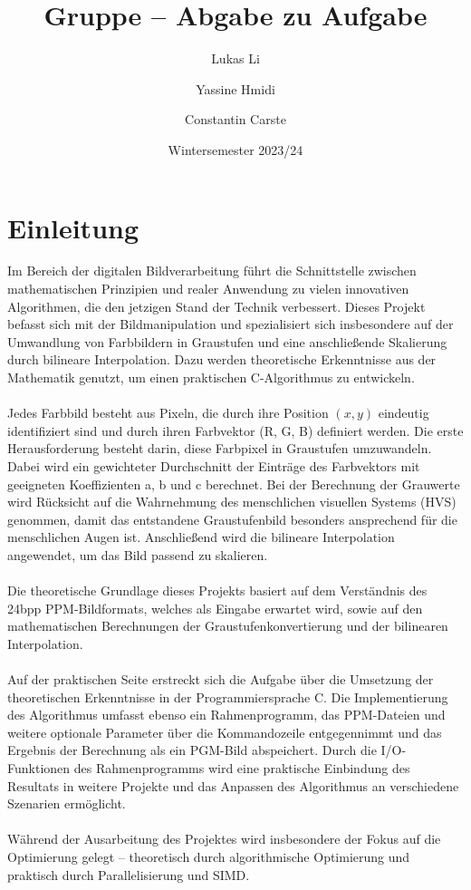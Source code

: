 \documentclass[course=erap]{aspdoc}
\author{Lukas Li \and Yassine Hmidi \and Constantin Carste}
\date{Wintersemester 2023/24} %
\title{Gruppe \theGroup{} -- Abgabe zu Aufgabe \theNumber}
\begin{document}
\maketitle

\section{Einleitung}
Im Bereich der digitalen Bildverarbeitung führt die Schnittstelle zwischen mathematischen Prinzipien und realer Anwendung zu vielen innovativen Algorithmen, die den jetzigen Stand der Technik verbessert. Dieses Projekt befasst sich mit der Bildmanipulation und spezialisiert sich insbesondere auf der Umwandlung von Farbbildern in Graustufen und eine anschließende Skalierung durch bilineare Interpolation. Dazu werden theoretische Erkenntnisse aus der Mathematik genutzt, um einen praktischen C-Algorithmus zu entwickeln.\\\\
Jedes Farbbild besteht aus Pixeln, die durch ihre Position $(x, y)$ eindeutig identifiziert sind und durch ihren Farbvektor (R, G, B) definiert werden. Die erste Herausforderung besteht darin, diese Farbpixel in Graustufen umzuwandeln. Dabei wird ein gewichteter Durchschnitt der Einträge des Farbvektors mit geeigneten Koeffizienten a, b und c berechnet. Bei der Berechnung der Grauwerte wird Rücksicht auf die Wahrnehmung des menschlichen visuellen Systems (HVS) genommen, damit das entstandene Graustufenbild besonders ansprechend für die menschlichen Augen ist. Anschließend wird die bilineare Interpolation angewendet, um das Bild passend zu skalieren.\\\\
Die theoretische Grundlage dieses Projekts basiert auf dem Verständnis des 24bpp PPM-Bildformats, welches als Eingabe erwartet wird, sowie auf den mathematischen Berechnungen der Graustufenkonvertierung und der bilinearen Interpolation.\\\\
Auf der praktischen Seite erstreckt sich die Aufgabe über die Umsetzung der theoretischen Erkenntnisse in der Programmiersprache C. Die Implementierung des Algorithmus umfasst ebenso ein Rahmenprogramm, das PPM-Dateien und weitere optionale Parameter über die Kommandozeile entgegennimmt und das Ergebnis der Berechnung als ein PGM-Bild abspeichert. Durch die I/O-Funktionen des Rahmenprogramms wird eine praktische Einbindung des Resultats in weitere Projekte und das Anpassen des Algorithmus an verschiedene Szenarien ermöglicht.\\\\
Während der Ausarbeitung des Projektes wird insbesondere der Fokus auf die Optimierung gelegt – theoretisch durch algorithmische Optimierung und praktisch durch Parallelisierung und SIMD.
\end{document}
